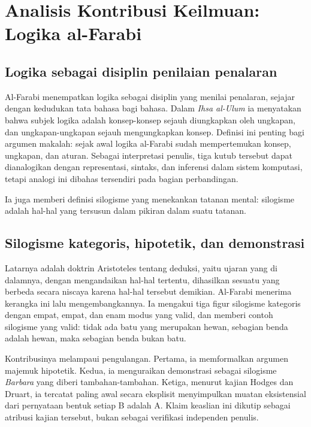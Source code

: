 \documentclass[12pt,a4paper]{article}
\begin{document}
\section{Analisis Kontribusi Keilmuan: Logika al-Farabi}

\subsection{Logika sebagai disiplin penilaian penalaran}

Al-Farabi menempatkan logika sebagai disiplin yang menilai penalaran, sejajar dengan kedudukan tata bahasa bagi bahasa. Dalam \emph{Ihsa al-Ulum} ia menyatakan bahwa subjek logika adalah konsep-konsep sejauh diungkapkan oleh ungkapan, dan ungkapan-ungkapan sejauh mengungkapkan konsep.\autocite[bag.~5]{hodges-druart2019} Definisi ini penting bagi argumen makalah: sejak awal logika al-Farabi sudah mempertemukan konsep, ungkapan, dan aturan. Sebagai interpretasi penulis, tiga kutub tersebut dapat dianalogikan dengan representasi, sintaks, dan inferensi dalam sistem komputasi, tetapi analogi ini dibahas tersendiri pada bagian perbandingan.

Ia juga memberi definisi silogisme yang menekankan tatanan mental: silogisme adalah hal-hal yang tersusun dalam pikiran dalam suatu tatanan.\autocite[bag.~7]{hodges-druart2019}

\subsection{Silogisme kategoris, hipotetik, dan demonstrasi}

Latarnya adalah doktrin Aristoteles tentang deduksi, yaitu ujaran yang di dalamnya, dengan mengandaikan hal-hal tertentu, dihasilkan sesuatu yang berbeda secara niscaya karena hal-hal tersebut demikian.\autocite[bag.~3]{smith2022} Al-Farabi menerima kerangka ini lalu mengembangkannya. Ia mengakui tiga figur silogisme kategoris dengan empat, empat, dan enam modus yang valid,\autocite[bag.~6.1]{hodges-druart2019} dan memberi contoh silogisme yang valid: tidak ada batu yang merupakan hewan, sebagian benda adalah hewan, maka sebagian benda bukan batu.\autocite[\emph{Syllogism} 27.6f, dikutip bag.~5]{hodges-druart2019}

Kontribusinya melampaui pengulangan. Pertama, ia memformalkan argumen majemuk hipotetik.\autocite[bag.~6.2]{hodges-druart2019} Kedua, ia menguraikan demonstrasi sebagai silogisme \emph{Barbara} yang diberi tambahan-tambahan.\autocite[bag.~6.4]{hodges-druart2019} Ketiga, menurut kajian Hodges dan Druart, ia tercatat paling awal secara eksplisit menyimpulkan muatan eksistensial dari pernyataan bentuk setiap B adalah A. Klaim keaslian ini dikutip sebagai atribusi kajian tersebut, bukan sebagai verifikasi independen penulis.\autocite[bag.~6.1]{hodges-druart2019}
\end{document}
